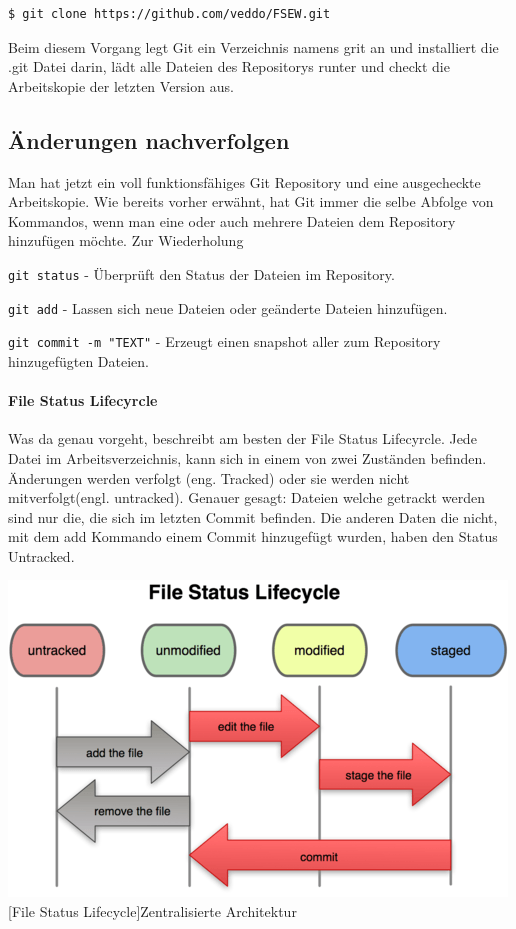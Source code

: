 \documentclass[12pt,a4paper,bibliography=totocnumbered,listof=totocnumbered]{scrartcl}
\begin{document}
\vspace{1em}
\begin{lstlisting}[caption=Git Repository Klonen, label=lst:arduino]
$ git clone https://github.com/veddo/FSEW.git
\end{lstlisting}

Beim diesem Vorgang legt Git ein Verzeichnis namens grit an und installiert die .git Datei darin, lädt alle Dateien des Repositorys runter und checkt die Arbeitskopie der letzten Version aus.




\subsection{ Änderungen nachverfolgen}
Man hat jetzt ein voll funktionsfähiges Git Repository und eine ausgecheckte Arbeitskopie.  Wie bereits vorher erwähnt, hat Git immer die selbe Abfolge von Kommandos, wenn man eine oder auch mehrere Dateien dem Repository hinzufügen möchte. Zur Wiederholung

\begin{compactitem}
	\item \lstinline|git status| - Überprüft den Status der Dateien im Repository.
	\item \lstinline|git add| - Lassen sich neue Dateien oder geänderte Dateien hinzufügen. 
	\item \lstinline|git commit -m "TEXT"| - Erzeugt einen snapshot aller zum Repository hinzugefügten Dateien.
\end{compactitem}

\paragraph{File Status Lifecyrcle}
Was da genau vorgeht, beschreibt am besten der File Status Lifecyrcle. Jede Datei im Arbeitsverzeichnis, kann sich in einem von zwei Zuständen befinden. Änderungen werden verfolgt (eng. Tracked) oder sie werden nicht mitverfolgt(engl. untracked). 
Genauer gesagt: Dateien welche getrackt werden sind nur die, die sich im letzten Commit befinden. Die anderen Daten die nicht, mit dem add Kommando einem Commit hinzugefügt wurden, haben den Status Untracked. \newline


\newline
\newline
\vspace{1em}
\begin{minipage}{\linewidth}
	\centering
	\includegraphics[width=0.6\linewidth]{Bilder/flc.png}
	[File Status Lifecycle]{Zentralisierte Architektur\footnotemark }
	\label{fig:osgi}
\end{minipage} 	
\end{document}
